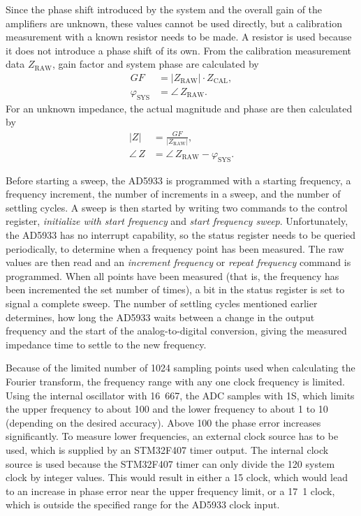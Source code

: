 Since the phase shift introduced by the system and the overall gain of the amplifiers are unknown, these values cannot
be used directly, but a calibration measurement with a known resistor needs to be made. A resistor is used because
it does not introduce a phase shift of its own.
From the calibration measurement data $ Z_\text{RAW} $, gain factor and system phase are calculated by
\begin{align}
  GF &= \left| Z_\text{RAW} \right| \cdot Z_\text{CAL} , \\
  \varphi_\text{SYS} &= \angle\, Z_\text{RAW}.
\end{align}
For an unknown impedance, the actual magnitude and phase are then calculated by
\begin{align}
  \left| Z \right| &= \frac{GF}{\left| Z_\text{RAW} \right|} , \\
  \angle\, Z &= \angle\, Z_\text{RAW} - \varphi_\text{SYS}.
\end{align}

Before starting a sweep, the AD5933 is programmed with a starting frequency, a frequency increment, the
number of increments in a sweep, and the number of settling cycles.
A sweep is then started by writing two commands to the control register, \emph{initialize with start frequency} and
\emph{start frequency sweep}. Unfortunately, the AD5933 has no interrupt capability, so the status register needs to
be queried periodically, to determine when a frequency point has been measured. The raw values are then read and an
\emph{increment frequency} or \emph{repeat frequency} command is programmed. When all points have been measured
(that is, the frequency has been incremented the set number of times), a bit in the status register is set to signal a
complete sweep.
The number of settling cycles mentioned earlier determines, how long the AD5933 waits between a change
in the output frequency and the start of the analog-to-digital conversion, giving the measured impedance time to
settle to the new frequency.

Because of the limited number of 1024 sampling points used when calculating the Fourier transform,
the frequency range with any one clock frequency is limited. Using the internal oscillator with
\unit{16.667}{\mega\hertz}, the ADC samples with \unit{1}{\mega{}S\per\second}, which limits the upper frequency to
about \unit{100}{\kilo\hertz} and the lower frequency to about \unit{1}{\kilo\hertz} to \unit{10}{\kilo\hertz}
(depending on the desired accuracy). Above \unit{100}{\kilo\hertz} the phase error increases significantly.
To measure lower frequencies, an external clock source has to be used, which is supplied by an STM32F407 timer output.
The internal clock source is used because the STM32F407 timer can only divide the \unit{120}{\mega\hertz} system clock
by integer values. This would result in either a \unit{15}{\mega\hertz} clock, which would lead to an increase in phase
error near the upper frequency limit, or a \unit{17.1}{\mega\hertz} clock, which is outside the specified range for
the AD5933 clock input.


